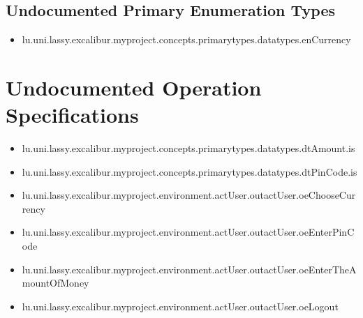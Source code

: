 \subsection[Undocumented Primary Enumeration Types]{Undocumented Primary Enumeration Types}
\begin{itemize}
\item lu.uni.lassy.excalibur.myproject.concepts.primarytypes.datatypes.enCurrency 
\end{itemize}















\section[Undocumented Operation Specifications]{Undocumented Operation Specifications}
\begin{itemize}
\item lu.uni.lassy.excalibur.myproject.concepts.primarytypes.datatypes.dtAmount.is 
\item lu.uni.lassy.excalibur.myproject.concepts.primarytypes.datatypes.dtPinCode.is 
\item lu.uni.lassy.excalibur.myproject.environment.actUser.outactUser.oeChooseCurrency 
\item lu.uni.lassy.excalibur.myproject.environment.actUser.outactUser.oeEnterPinCode 
\item lu.uni.lassy.excalibur.myproject.environment.actUser.outactUser.oeEnterTheAmountOfMoney 
\item lu.uni.lassy.excalibur.myproject.environment.actUser.outactUser.oeLogout 
\end{itemize}








